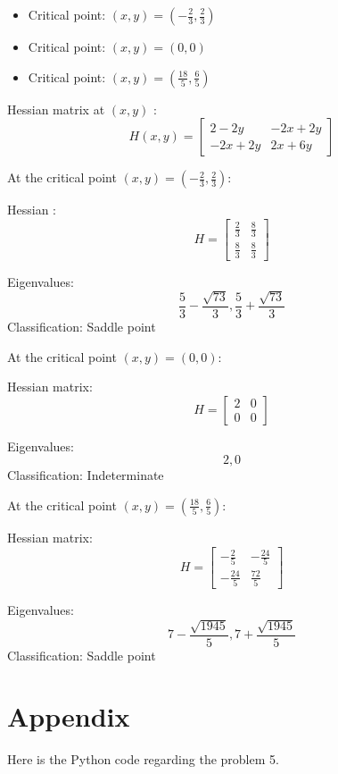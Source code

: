 \documentclass{article} %
\begin{document}
{    \begin{itemize}
    \item Critical point: $(x, y) = (- \frac{2}{3}, \frac{2}{3})$
    \item Critical point: $(x, y) = (0, 0)$
    \item Critical point: $(x, y) = (\frac{18}{5}, \frac{6}{5})$
    \end{itemize}

    Hessian matrix at $(x, y)$ : \[ H(x, y) = \begin{bmatrix}
        2 - 2y & -2x + 2y \\
        -2x + 2y & 2x + 6y
    \end{bmatrix} \]

    At the critical point $(x, y) = (- \frac{2}{3}, \frac{2}{3})$:

    Hessian :
    \[
    H = \left[\begin{matrix}\frac{2}{3} & \frac{8}{3}\\\frac{8}{3} & \frac{8}{3}\end{matrix}\right]
    \]

    Eigenvalues:
    \[
    \frac{5}{3} - \frac{\sqrt{73}}{3}, \frac{5}{3} + \frac{\sqrt{73}}{3}
    \]
    Classification: 	Saddle point\
    \bigskip

    At the critical point $(x, y) = (0, 0)$:

    Hessian matrix:
    \[
    H = \left[\begin{matrix}2 & 0\\0 & 0\end{matrix}\right]
    \]

    Eigenvalues:
    \[
    2, 0
    \]
    Classification: 	Indeterminate\
    \bigskip

    At the critical point $(x, y) = (\frac{18}{5}, \frac{6}{5})$:

    Hessian matrix:
    \[
    H = \left[\begin{matrix}- \frac{2}{5} & - \frac{24}{5}\\- \frac{24}{5} & \frac{72}{5}\end{matrix}\right]
    \]

    Eigenvalues:
    \[
    7 - \frac{\sqrt{1945}}{5}, 7 + \frac{\sqrt{1945}}{5}
    \]
    Classification: 	Saddle point\
    \bigskip

}   

\clearpage
\section*{Appendix}
Here is the Python code regarding the problem 5.
\end{document}
